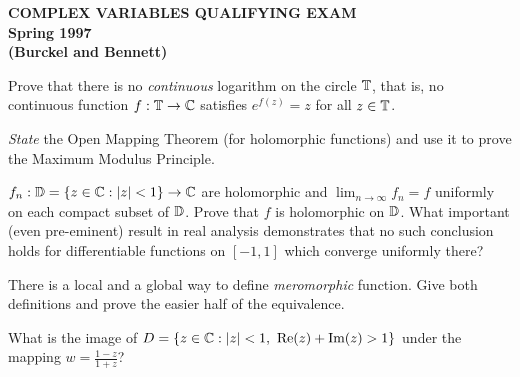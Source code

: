 \documentclass[bbb]{report}
\def\ds{\displaystyle}
\begin{document}
\pagestyle{empty}

\begin{Large}
\begin{center}
{\bf   COMPLEX VARIABLES QUALIFYING EXAM \\
   Spring 1997 \\
   (Burckel and Bennett)} \\
\end{center}
\end{Large}

\begin{large}

\vspace{.2in}

\begin{description}{\bf

\item[1.]  Prove that there is no {\it continuous} logarithm on
the circle ${\Bbb T}$, that is, no continuous function 
$f:{\Bbb T}\to{\Bbb C}$ satisfies $e^{f(z)}=z$ for all $z\in{\Bbb T}$.


\vspace{.5in}

\item[2.] {\it State} the Open Mapping Theorem (for holomorphic
functions) and use it to prove the Maximum Modulus Principle.

\vspace{.5in}

\item[3.] $f_n:{\Bbb D}=\{z\in{\Bbb C}:|z|<1\}\to{\Bbb C}$ are
holomorphic and $\ds\lim_{n\to\infty}f_n=f$ uniformly on each
compact subset of ${\Bbb D}$. Prove that $f$ is holomorphic on 
${\Bbb D}$. What important (even pre-eminent)
result in real analysis demonstrates that no such conclusion
holds for differentiable functions on $[-1,1]$ which converge
uniformly there?

\vspace{.5in}

\item[4.] There is a local and a global way to define {\it
meromorphic} function. Give both definitions and prove the easier
half of the equivalence.

\vspace{.5in}

\item[5.] What is the image of 
$D=\{z\in{\Bbb C}:|z|<1,\ \hbox{Re}(z)+\hbox{Im}(z)>1\}$ 
under the mapping $w=\ds\frac{1-z}{1+z}$?

\vspace{.5in}

}
\end{description}
\end{large}
\end{document}
